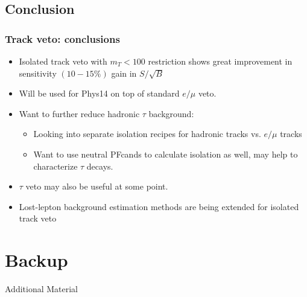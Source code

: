 \documentclass{beamer}
\begin{document}
\subsection{Conclusion}
\begin{frame}
  \frametitle{Track veto: conclusions}
  \begin{itemize}
  \item Isolated track veto with $m_T<100$ restriction shows great
    improvement in sensitivity $(10-15\%)$ gain in
    $S/\sqrt{B}$
    \item Will be used for Phys14 on top of standard
    $e/\mu$ veto.
  \item Want to further reduce hadronic $\tau$ background:
    \begin{itemize}
    \item Looking into separate isolation recipes for hadronic tracks vs. $e/\mu$
      tracks
    \item Want to use neutral PFcands to calculate isolation as well, may
      help to characterize $\tau$ decays.
    \end{itemize}
  \item $\tau$ veto may also be useful at some point.
  \item Lost-lepton background estimation methods are being extended for isolated track veto
  \end{itemize}
\end{frame}












\section{Backup}
\begin{frame}
  \begin{center}
    {\Large Additional Material}
  \end{center}
\end{frame}
\end{document}
